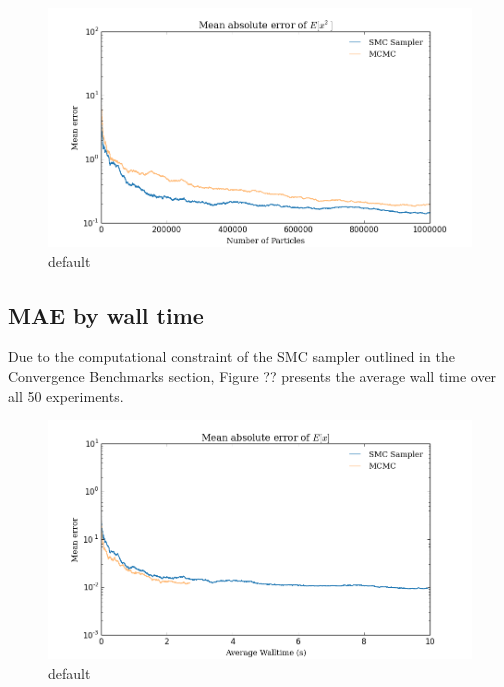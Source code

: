 \documentclass[12pt]{elsarticle}
\begin{document}
\begin{figure}[htbp]
\begin{center}
\includegraphics[width = \textwidth]{plots/E_X2.png}
\caption{default}
\label{default}
\end{center}
\end{figure}

\subsection*{MAE by wall time}
Due to the computational constraint of the SMC sampler outlined in the Convergence Benchmarks section, Figure ?? presents the average wall time over all 50 experiments.

\begin{figure}[htbp]
\begin{center}
\includegraphics[width = \textwidth]{plots/E_X_walltime.png}
\caption{default}
\label{default}
\end{center}
\end{figure}
\end{document}
